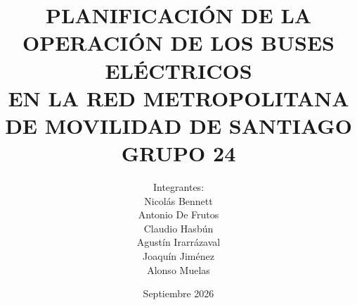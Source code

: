\documentclass[pdftex,spanish]{pucthesis}	%
\begin{document}


\title[PLANIFICACI\'ON DE LA OPERACI\'ON DE LOS BUSES EL\'ECTRICOS\\ EN LA RED METROPOLITANA DE MOVILIDAD DE SANTIAGO\\ GRUPO 24]
   {\bf PLANIFICACI\'ON DE LA OPERACI\'ON DE LOS BUSES EL\'ECTRICOS\\ EN LA RED METROPOLITANA DE MOVILIDAD DE SANTIAGO\\ GRUPO 24}
\author[Integrantes:]{Integrantes:\\
\textnormal{\small{
Nicol\'as Bennett\\
Antonio De Frutos\\
Claudio Hasb\'un\\
Agust\'in Irarr\'azaval\\
Joaqu\'in Jim\'enez\\
Alonso Muelas}
}
}

\address{Escuela de Ingenier\'ia\\
                   Pontificia Universidad Cat\'olica de Chile\\
                   Vicu\~na Mackenna 4860\\
                  Santiago, Chile\\
                  {\it Tel.\/} : 56 (2) 354-2000}


\date                                 {Septiembre 2026}


\NoChapterPageNumber
{}
\maketitle

\end{document}
